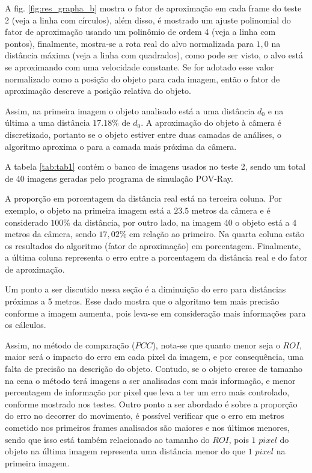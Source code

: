 A fig. \ref{fig:res_grapha_b} mostra o fator de aproximação em cada frame 
do teste 2 (veja a linha com círculos),
além disso, é mostrado um ajuste polinomial do fator de aproximação usando 
um polinômio de ordem 4 (veja a linha com pontos),
finalmente, mostra-se a rota real do alvo normalizada para $1,0$ na 
distância máxima (veja a linha com quadrados),
como pode ser visto, o alvo está se aproximando com uma velocidade constante.
Se for adotado esse valor normalizado como a posição do objeto para cada imagem, então o fator de aproximação
descreve a posição relativa do objeto.

Assim, na primeira imagem o objeto analisado está a uma distância $d_0$
e na última a uma distância $17.18\%$ de $d_0$.
A aproximação do objeto à câmera é discretizado, portanto se o objeto
estiver entre duas camadas de análises, o algoritmo aproxima o para
a camada mais próxima da câmera.

A tabela \ref{tab:tab1} contém o banco de imagens usados no teste 2, sendo um total de 40 imagens geradas
pelo programa de simulação POV-Ray.

A proporção em porcentagem da distância real está na terceira coluna. Por exemplo, o objeto na primeira imagem
está a $23.5$ metros da câmera e é considerado $100$\% da distância, por outro lado, na imagem 40 o objeto está a
$4$ metros da câmera, sendo $17,02$\% em relação ao primeiro. Na quarta coluna estão os resultados do algoritmo (fator
de aproximação) em porcentagem. Finalmente, a última coluna representa o erro entre a porcentagem da distância real e do
fator de aproximação.

Um ponto a ser discutido nessa seção é a diminuição do erro para distâncias próximas a 5 metros. Esse dado 
mostra que o algoritmo tem mais precisão conforme a imagem aumenta, pois leva-se em consideração mais informações
para os cálculos.

Assim, no método de comparação ($PCC$), nota-se que quanto menor seja o $ROI$, 
maior será o impacto do erro em cada pixel da imagem, 
e por consequência, uma falta de precisão na descrição do objeto. Contudo, se o objeto cresce de tamanho na cena
o método terá imagens a ser analisadas com mais informação, e menor percentagem de informação por pixel
que leva a ter um erro mais controlado, conforme
mostrado nos testes. Outro ponto a ser abordado é sobre a proporção do erro no decorrer do movimento, é possível
verificar que o erro em metros cometido nos primeiros frames analisados são maiores e nos últimos menores, sendo que
isso está também relacionado ao tamanho do $ROI$, pois $1$ $pixel$ do objeto na última imagem representa uma distância
menor do que $1$ $pixel$ na primeira imagem. 

